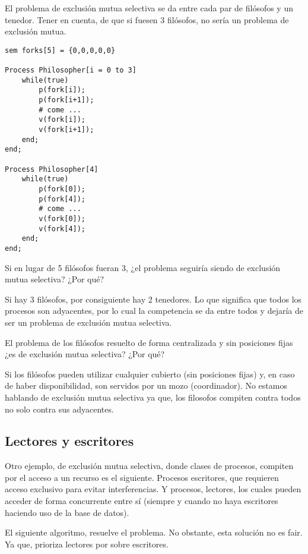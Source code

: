 \documentclass[a4paper, 10pt]{report}
\begin{document}
El problema de exclusión mutua selectiva se da entre cada par de filósofos y un tenedor. Tener en cuenta, de que si fuesen 3 filósofos, no sería un problema de exclusión mutua.


\begin{lstlisting}[multicols=2]
sem forks[5] = {0,0,0,0,0}

Process Philosopher[i = 0 to 3]
	while(true)
		p(fork[i]);
		p(fork[i+1]);
		# come ...
		v(fork[i]); 
		v(fork[i+1]);
	end;
end;

Process Philosopher[4]
	while(true)
		p(fork[0]);
		p(fork[4]);
		# come ...
		v(fork[0]); 
		v(fork[4]);
	end;
end;
\end{lstlisting}

\begin{basic_box}
	 Si en lugar de 5 filósofos fueran 3, ¿el problema seguiría siendo de exclusión mutua selectiva? ¿Por qué?

	Si hay 3 filósofos, por consiguiente hay 2 tenedores. Lo que significa que todos los procesos son adyacentes, por lo cual la competencia se da entre todos y dejaría de ser un problema de exclusión mutua selectiva.
\end{basic_box}
\begin{basic_box}
	 El problema de los filósofos resuelto de forma centralizada y sin posiciones fijas ¿es de exclusión mutua selectiva? ¿Por qué?

	Si los filósofos pueden utilizar cualquier cubierto (sin posiciones fijas) y, en caso de haber disponibilidad, son servidos por un mozo (coordinador). No estamos hablando de exclusión mutua selectiva ya que, los filosofos compiten contra todos no solo contra sus adyacentes.
\end{basic_box}

\subsection{Lectores y escritores}

Otro ejemplo, de exclusión mutua selectiva, donde clases de procesos, compiten por el acceso a un recurso es el siguiente. Procesos escritores, que requieren acceso exclusivo para evitar interferencias. Y procesos, lectores, los cuales pueden acceder de forma concurrente entre sí (siempre y cuando no haya escritores haciendo uso de la base de datos).

El siguiente algoritmo, resuelve el problema. No obstante, esta solución no es fair. Ya que, prioriza lectores por sobre escritores.
\end{document}
